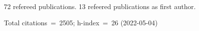 72 refereed publications. 13 refeered publications as first author.

Total citations~=~2505; h-index~=~26 (2022-05-04)